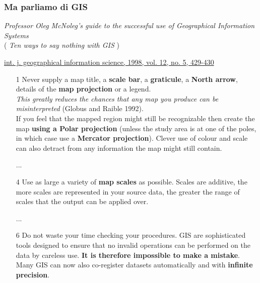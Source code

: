 \documentclass{beamer}
\begin{document}
{\begin{frame}
\end{frame}

\begin{frame}[allowframebreaks]
   \frametitle{Ma parliamo di GIS}
   \begin{center}
       \textsl{Professor Oleg McNoleg's guide to the successful use of Geographical
       Information Systems}
    \\( \textit{Ten ways to say nothing with GIS} )
   \end{center} 
    \href{https://teachgis.org/wp-content/uploads/2013/03/NoLeg_1998.pdf}
        {{\scriptsize int. j. geographical information science, 1998, vol. 12, no. 5, 429-430}}

    \begin{enumerate}
        \item [1] Never supply a map title, a \textbf{scale bar}, a \textbf{graticule},
      a \textbf{North arrow}, details of the \textbf{map projection} or a legend.\\
      \textit{This greatly reduces the chances that any map you produce can be misinterpreted}
      (Globus and Raible 1992).\\
      If you feel that the mapped region might still be recognizable then create the map
\textbf{using a Polar projection} (unless the study area is at one of the poles, in which
case use a \textbf{Mercator projection}). Clever use of colour and scale can also
detract from any information the map might still contain.

        \item [...]

        \item [4] Use as large a variety of \textbf{map scales} as possible.
        Scales are additive, the more scales are represented in your source data,
        the greater the range of scales that the output can be applied over.
        
        \item [...]
        
        \item [6] Do not waste your time checking your procedures.
        GIS are sophisticated tools designed to ensure that no invalid operations
        can be performed on the data by careless use.
        \textbf{It is therefore impossible to make a mistake}.
        Many GIS can now also co-register datasets automatically and with \textbf{infinite precision}.
        
    \end{enumerate}


\end{frame}}
\end{document}
